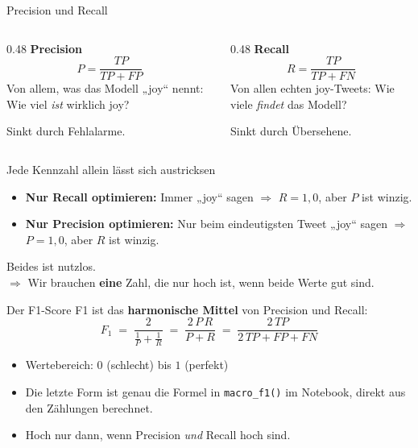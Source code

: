 \documentclass[aspectratio=169,11pt]{beamer}
\begin{document}
\begin{frame}{Precision und Recall}
  \begin{columns}[T]
    \begin{column}{0.48\textwidth}
      \textbf{Precision}
      \[
        P = \frac{TP}{TP + FP}
      \]
      Von allem, was das Modell „joy“ nennt: Wie viel \emph{ist} wirklich joy?

      \vspace{0.5em}
      Sinkt durch \alert{Fehlalarme}.
    \end{column}
    \begin{column}{0.48\textwidth}
      \textbf{Recall}
      \[
        R = \frac{TP}{TP + FN}
      \]
      Von allen echten joy-Tweets: Wie viele \emph{findet} das Modell?

      \vspace{0.5em}
      Sinkt durch \alert{Übersehene}.
    \end{column}
  \end{columns}
\end{frame}

\begin{frame}{Jede Kennzahl allein lässt sich austricksen}
  \begin{itemize}
    \item \textbf{Nur Recall optimieren:} Immer „joy“ sagen \(\Rightarrow\) \(R = 1{,}0\), aber \(P\) ist winzig.
    \item \textbf{Nur Precision optimieren:} Nur beim eindeutigsten Tweet „joy“ sagen \(\Rightarrow\) \(P = 1{,}0\), aber \(R\) ist winzig.
  \end{itemize}

  \vspace{1em}
  Beides ist nutzlos.\\[0.5em]
  \(\Rightarrow\) Wir brauchen \textbf{eine} Zahl, die nur hoch ist, wenn \alert{beide} Werte gut sind.
\end{frame}

\begin{frame}{Der F1-Score}
  F1 ist das \textbf{harmonische Mittel} von Precision und Recall:
  \[
    F_1 \;=\; \frac{2}{\frac{1}{P} + \frac{1}{R}}
        \;=\; \frac{2\,P\,R}{P + R}
        \;=\; \frac{2\,TP}{2\,TP + FP + FN}
  \]

  \begin{itemize}
    \item Wertebereich: \(0\) (schlecht) bis \(1\) (perfekt)
    \item Die letzte Form ist genau die Formel in \texttt{macro\_f1()} im Notebook, direkt aus den Zählungen berechnet.
    \item Hoch \alert{nur dann}, wenn Precision \emph{und} Recall hoch sind.
  \end{itemize}
\end{frame}
\end{document}
